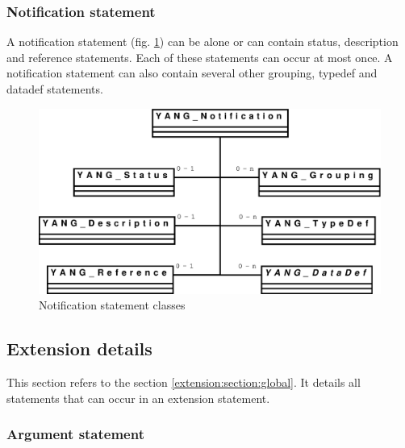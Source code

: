 \documentclass[a4paper]{article}
\begin{document}
\subsubsection{Notification statement}

A notification  statement (fig.   \ref{notification}) can be  alone or
can  contain status,  description and  reference statements.   Each of
these statements can occur at  most once. A notification statement can
also contain several other grouping, typedef and datadef statements.
\begin{figure}[htbp]
\begin{center}
\includegraphics[scale = .3]{notification.eps}
\end{center}
\caption{Notification statement classes}
\label{notification}
\end{figure}

\subsection{Extension details}
\label{extension:section:detail}

This section refers  to the section \ref{extension:section:global}. It
details all statements that can occur in an extension statement.

\subsubsection{Argument statement}
\end{document}
